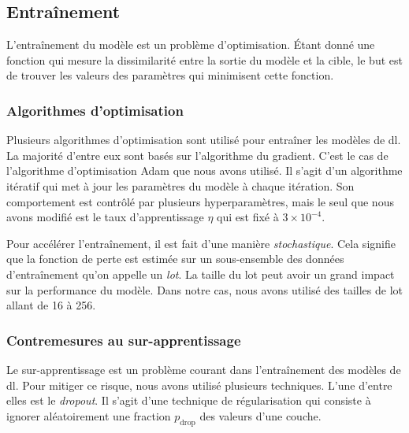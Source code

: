 \subsection{Entraînement}

L'entraînement du modèle est un problème d'optimisation.
Étant donné une fonction qui mesure la dissimilarité entre la sortie du modèle et la cible,
le but est de trouver les valeurs des paramètres qui minimisent cette fonction.

\subsubsection{Algorithmes d'optimisation}

Plusieurs algorithmes d'optimisation sont utilisé pour entraîner les modèles de \gls{dl}.
La majorité d'entre eux sont basés sur l'algorithme du gradient.
C'est le cas de l'algorithme d'optimisation Adam \cite{Kingma_Ba_2017} que nous avons utilisé.
Il s'agit d'un algorithme itératif qui met à jour les paramètres du modèle à chaque itération.
Son comportement est contrôlé par plusieurs hyperparamètres,
mais le seul que nous avons modifié est le taux d'apprentissage \(\eta\) qui est fixé à \(3\times10^{-4}\).

Pour accélérer l'entraînement, il est fait d'une manière \emph{stochastique}.
Cela signifie que la fonction de perte est estimée 
sur un sous-ensemble des données d'entraînement qu'on appelle un \emph{lot}.
La taille du lot peut avoir un grand impact sur la performance du modèle.
Dans notre cas, nous avons utilisé des tailles de lot allant de 16 à 256.


\subsubsection{Contremesures au sur-apprentissage}

Le sur-apprentissage est un problème courant dans l'entraînement des modèles de \gls{dl}.
Pour mitiger ce risque, nous avons utilisé plusieurs techniques.
L'une d'entre elles est le \emph{\foreignlanguage{english}{dropout}}.
Il s'agit d'une technique de régularisation 
qui consiste à ignorer aléatoirement une fraction \(p_{\mathrm{drop}}\) des valeurs d'une couche.

